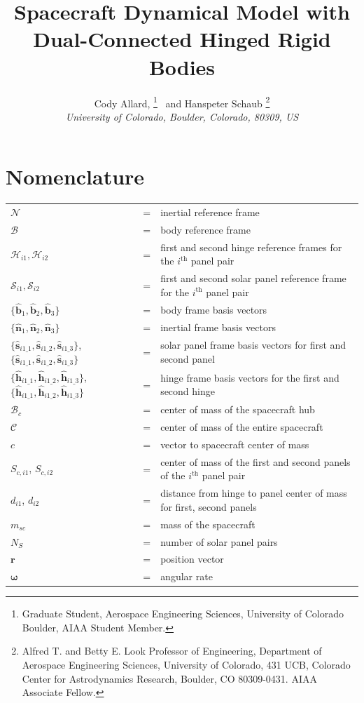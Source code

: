\documentclass[paper]{aiaaNew}
\title{Spacecraft Dynamical Model with Dual-Connected Hinged Rigid Bodies}
\author{
	Cody Allard,%
	\thanks{Graduate Student, Aerospace Engineering Sciences, University of Colorado Boulder, AIAA Student Member.}
	\ and  Hanspeter Schaub%
	\thanks{Alfred T. and Betty E. Look Professor of Engineering, Department of Aerospace Engineering Sciences, University of Colorado, 431 UCB, Colorado Center for Astrodynamics Research, Boulder, CO 80309-0431. AIAA Associate Fellow.}\\
	{\normalsize\itshape
		University of Colorado, Boulder, Colorado, 80309, US}\\
}
\begin{document}
	
	
	\maketitle

	\section*{Nomenclature}
	\noindent\begin{tabular}{@{}lcl@{}}
		$\mathcal{N}$ &=& inertial reference frame \\
		$\mathcal{B}$ &=& body reference frame \\
		$\mathcal{H}_{i1}, \mathcal{H}_{i2}$ &=& first and second hinge reference frames for the $i^\text{th}$ panel pair \\
		$\mathcal{S}_{i1}, \mathcal{S}_{i2}$ &=& first and second solar panel reference frame for the $i^\text{th}$ panel pair \\
		$\{\hat{\bm b}_1,\hat{\bm b}_2,\hat{\bm b}_3\}$  &=&  body frame basis vectors\\
		$\{\hat{\bm n}_1,\hat{\bm n}_2,\hat{\bm n}_3\}$  &=&  inertial frame basis vectors\\
		$\{\hat{\bm s}_{i1\_1},\hat{\bm s}_{i1\_2},\hat{\bm s}_{i1\_3}\}$, $\{\hat{\bm s}_{i1\_1},\hat{\bm s}_{i1\_2},\hat{\bm s}_{i1\_3}\}$  &=&  solar panel frame basis vectors for first and second panel \\
		$\{\hat{\bm h}_{i1\_1},\hat{\bm h}_{i1\_2},\hat{\bm h}_{i1\_3}\}$, $\{\hat{\bm h}_{i1\_1},\hat{\bm h}_{i1\_2},\hat{\bm h}_{i1\_3}\}$ &=& hinge frame basis vectors for the first and second hinge \\
		$\mathcal{B}_{c}$ &=& center of mass of the spacecraft hub \\
		$\mathcal{C}$ &=& center of mass of the entire spacecraft \\
		$c$ &=& vector to spacecraft center of mass  \\
		$S_{c,i1}$,  $S_{c,i2}$ &=& center of mass of the first and second panels of the $i^\text{th}$ panel pair \\
		$d_{i1}$, $d_{i2}$ &=& distance from hinge to panel center of mass for first, second panels \\
		$m_{sc}$ &=& mass of the spacecraft \\
		$N_{S}$ &=& number of solar panel pairs \\
		$\bm r$ &=& position vector \\
		$\bm \omega $ &=& angular rate \\

\end{tabular}
\end{document}
